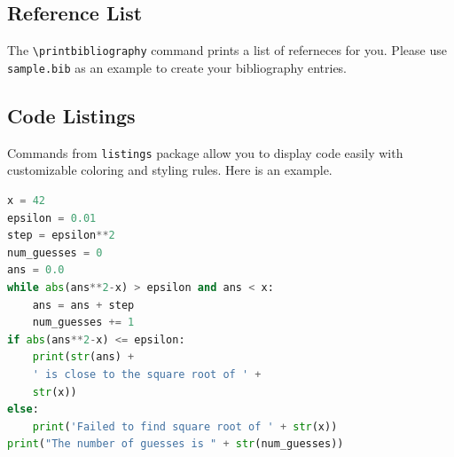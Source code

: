 \documentclass{article}
\begin{document}
\subsection{Reference List}
The \verb+\printbibliography+ command prints a list of referneces for you. Please use \texttt{sample.bib} as an example to create your bibliography entries.

\subsection{Code Listings}
Commands from \texttt{listings} package allow you to display code easily with customizable coloring and styling rules. Here is an example.

\begin{lstlisting}[language=Python,  caption=Python example]
x = 42
epsilon = 0.01
step = epsilon**2
num_guesses = 0
ans = 0.0
while abs(ans**2-x) > epsilon and ans < x:
    ans = ans + step
    num_guesses += 1
if abs(ans**2-x) <= epsilon:
    print(str(ans) +
    ' is close to the square root of ' +
    str(x))
else:
    print('Failed to find square root of ' + str(x))
print("The number of guesses is " + str(num_guesses))
\end{lstlisting}
\end{document}
